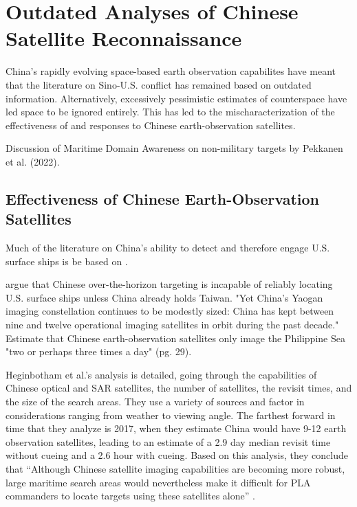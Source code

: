 \documentclass[12pt]{article}
\begin{document}
\section{Outdated Analyses of Chinese Satellite Reconnaissance}

China's rapidly evolving space-based earth observation capabilites have meant that the literature on Sino-U.S. conflict has remained based on outdated information. Alternatively, excessively pessimistic estimates of counterspace have led space to be ignored entirely. This has led to the mischaracterization of the effectiveness of and responses to Chinese earth-observation satellites.

Discussion of Maritime Domain Awareness on non-military targets by Pekkanen et al. (2022). 

\subsection{Effectiveness of Chinese Earth-Observation Satellites}

Much of the literature on China's ability to detect and therefore engage U.S. surface ships is be based on \cite{heginbothamUSChinaMilitaryScorecard2015}.

\cite{greenThenWhatAssessing2022} argue that Chinese over-the-horizon targeting is incapable of reliably locating U.S. surface ships unless China already holds Taiwan. "Yet China's Yaogan imaging constellation continues to be modestly sized: China has kept between nine and twelve operational imaging satellites in orbit during the past decade." Estimate that Chinese earth-observation satellites only image the Philippine Sea "two or perhaps three times a day" (pg. 29). 


Heginbotham et al.'s analysis is detailed, going through the capabilities of Chinese optical and SAR satellites, the number of satellites, the revisit times, and the size of the search areas. They use a variety of sources and factor in considerations ranging from weather to viewing angle. The farthest forward in time that they analyze is 2017, when they estimate China would have 9-12 earth observation satellites, leading to an estimate of a 2.9 day median revisit time without cueing and a 2.6 hour with cueing.\cite[pp.162]{heginbothamUSChinaMilitaryScorecard2015} Based on this analysis, they conclude that “Although Chinese satellite imaging capabilities are becoming more robust, large maritime search areas would nevertheless make it difficult for PLA commanders to locate targets using these satellites alone” \cite[pp.~159-160]{heginbothamUSChinaMilitaryScorecard2015}. 
\end{document}
